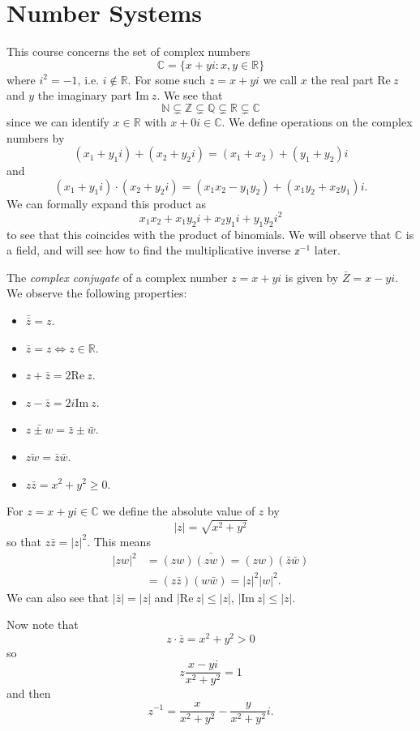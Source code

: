 \section{Number Systems}
This course concerns the set of complex numbers
$$
\mathbb{C} = \{ x + yi : x, y \in \mathbb{R} \}
$$
where $i^2 = -1$, i.e. $i \notin \mathbb{R}$. For some such
$z = x + yi$ we call $x$ the real part $\mathrm{Re}~z$ and
$y$ the imaginary part $\mathrm{Im}~z$. We see that
$$
           \mathbb{N}
\subsetneq \mathbb{Z}
\subsetneq \mathbb{Q}
\subsetneq \mathbb{R}
\subsetneq \mathbb{C}
$$
since we can identify $x \in \mathbb{R}$ with
$x + 0i \in \mathbb{C}$. We define operations on the complex numbers by
$$
(x_1 + y_1 i) + (x_2 + y_2 i) = (x_1 + x_2) + (y_1 + y_2) i
$$
and
$$
  (x_1 + y_1 i) \cdot (x_2 + y_2 i)
= (x_1 x_2 - y_1 y_2) + (x_1 y_2 + x_2 y_1)i.
$$
We can formally expand this product as
$$
x_1 x_2 + x_1 y_2 i + x_2 y_1 i + y_1 y_2 i^2
$$
to see that this coincides with the product of binomials.
We will observe that $\mathbb{C}$ is a field, and will see how
to find the multiplicative inverse $\mathbb{z}^{-1}$ later.

The \emph{complex conjugate} of a complex number $z = x + yi$ is given by
$\bar{Z} = x - yi$. We observe the following properties:
\begin{itemize}
  \item{
    $\bar{\bar{z}} = z$.
  }
  \item{
    $\bar{z} = z \iff z \in \mathbb{R}$.
  }
  \item{
    $z + \bar{z} = 2 \mathrm{Re}~z$.
  }
  \item{
    $z - \bar{z} = 2i \mathrm{Im}~z$.
  }
  \item{
    $\bar{z \pm w} = \bar{z} \pm \bar{w}$.
  }
  \item{
    $\bar{zw} = \bar{z}\bar{w}$.
  }
  \item{
    $z\bar{z} = x^2 + y^2 \geq 0$.
  }
\end{itemize}

For $z = x + yi \in \mathbb{C}$ we define the absolute value of $z$ by
$$
|z| = \sqrt{x^2 + y^2}
$$
so that $z \bar{z} = |z|^2$. This means
\begin{align*}
  |zw|^2 &= (zw)\bar{(zw)} = (zw)(\bar{z}\bar{w}) \\
         &= (z \bar{z})(w \bar{w}) = |z|^2|w|^2.
\end{align*}
We can also see that $|\bar{z}| = |z|$ and
$|\mathrm{Re}~z| \leq |z|$, $|\mathrm{Im}~z| \leq |z|$.

Now note that
$$
z \cdot \bar{z} = x^2 + y^2 > 0
$$
so
$$
z \frac{x - y i}{x^2 + y^2} = 1
$$
and then
$$
z^{-1} = \frac{x}{x^2 + y^2} - \frac{y}{x^2 + y^2} i.
$$

